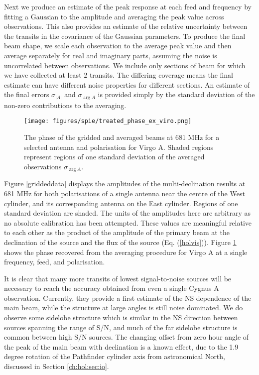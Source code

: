 Next we produce an estimate of the peak response at each feed and frequency by fitting a Gaussian to the amplitude and averaging the peak value across observations. This also provides an estimate of the relative uncertainty between the transits in the covariance of the Gaussian parameters. To produce the final beam shape, we scale each observation to the average peak value and then average separately for real and imaginary parts, assuming the noise is uncorrelated between observations. We include only sections of beam for which we have collected at least 2 transits. The differing coverage means the final estimate can have different noise properties for different sections. An estimate of the final errors $\sigma_{|A|}$ and $\sigma_{\arg{A}}$ is provided simply by the standard deviation of the non-zero contributions to the averaging.

\begin{figure}[h!] %
	\centering
	\texttt{[image: figures/spie/treated\_phase\_ex\_viro.png]}%
	\caption{The phase of the gridded and averaged beams at 681 MHz for a selected antenna and polarisation for Virgo A. Shaded regions represent regions of one standard deviation of the averaged observations $\sigma_{\arg{A}}$.}
	\label{phaseav}
\end{figure} 

Figure \ref{griddeddata} displays the amplitudes of the multi-declination results at 681 MHz for both polarisations of a single antenna near the centre of the West cylinder, and its corresponding antenna on the East cylinder. Regions of one standard deviation are shaded. The units of the amplitudes here are arbitrary as no absolute calibration has been attempted. These values are meaningful relative to each other as the product of the amplitude of the primary beam at the declination of the source and the flux of the source (Eq. (\ref{holvis})). Figure \ref{phaseav} shows the phase recovered from the averaging procedure for Virgo A at a single frequency, feed, and polarisation.

It is clear that many more transits of lowest signal-to-noise sources will be necessary to reach the accuracy obtained from even a single Cygnus A observation. Currently, they provide a first estimate of the NS dependence of the main beam, while the structure at large angles is still noise dominated. We do observe some sidelobe structure which is similar in the NS direction between sources spanning the range of S/N, and much of the far sidelobe structure is common between high S/N sources. The changing offset from zero hour angle of the peak of the main beam with declination is a known effect, due to the 1.9 degree rotation of the Pathfinder cylinder axis from astronomical North, discussed in Section \ref{ch:hol:sec:io}. 

